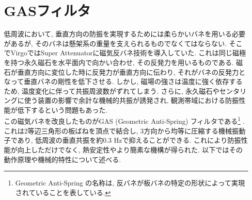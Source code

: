 \section{GASフィルタ}
低周波において, 垂直方向の防振を実現するためには柔らかいバネを用いる必要があるが, そのバネは懸架系の重量を支えられるものでなくてはならない. そこでVirgoではSuper Attenuatorに磁気反バネ技術を導入していた. これは同じ磁極を持つ永久磁石を水平面内で向かい合わせ, その反発力を用いるものである. 磁石が垂直方向に変位した時に反発力が垂直方向に伝わり, それがバネの反発力となって垂直バネの剛性を低下させる. しかし, 磁場の強さは温度に強く依存するため, 温度変化に伴って共振周波数がずれてしまう. さらに, 永久磁石やセンタリングに使う装置の影響で余計な機械的共振が誘発され, 観測帯域における防振性能が低下するという問題もあった. \\
\quad この磁気バネを改良したものがGAS (Geometric Anti-Spring) フィルタである\footnote{Geometric Anti-Spring の名称は, 反バネが板バネの特定の形状によって実現されていることを表している. }
. これは2等辺三角形の板ばねを頂点で結合し, 3方向から均等に圧縮する機械振動子であり, 低周波の垂直共振を約0.3 Hzで抑えることができる. これにより防振性能が向上しただけでなく, 熱安定性やより簡素な機構が得られた. 以下ではその動作原理や機械的特性について述べる. 

